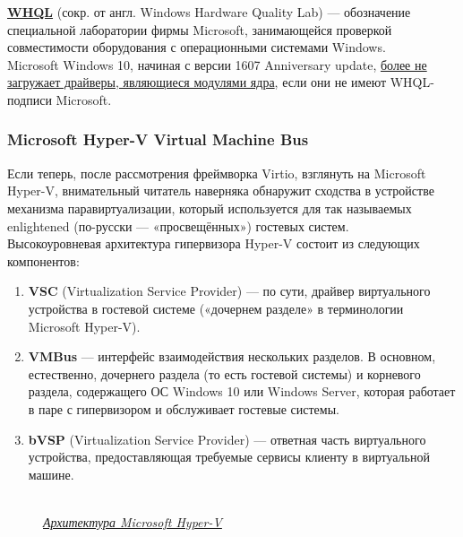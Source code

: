 \documentclass[14pt, a4paper]{article}
\begin{document}
\href{https://ru.wikipedia.org/wiki/WHQL}{\textbf{WHQL}} (сокр. от англ. Windows Hardware Quality Lab) — обозначение специальной лаборатории
фирмы Microsoft, занимающейся проверкой совместимости оборудования с операционными
системами Windows.\\

Microsoft Windows 10, начиная с версии 1607 Anniversary update, \href{https://techcommunity.microsoft.com/t5/Windows-Hardware-Certification/Driver-Signing-changes-in-Windows-10-version-1607/ba-p/364894}{более не загружает драйверы,
являющиеся модулями ядра}, если они не имеют WHQL-подписи Microsoft.

\subsubsection*{Microsoft Hyper-V Virtual Machine Bus} 

Если теперь, после рассмотрения фреймворка Virtio, взглянуть на Microsoft Hyper-V, внимательный
читатель наверняка обнаружит сходства в устройстве механизма паравиртуализации, который
используется для так называемых enlightened (по-русски — «просвещённых») гостевых систем.\\

Высокоуровневая архитектура гипервизора Hyper-V состоит из следующих компонентов:

\begin{enumerate}
    \item \textbf{VSC} (Virtualization Service Provider) — по сути, драйвер виртуального устройства в гостевой
    системе («дочернем разделе» в терминологии Microsoft Hyper-V).
    \item \textbf{VMBus} — интерфейс взаимодействия нескольких разделов. В основном, естественно,
    дочернего раздела (то есть гостевой системы) и корневого раздела, содержащего ОС Windows
    10 или Windows Server, которая работает в паре с гипервизором и обслуживает гостевые
    системы.
    \item \textbf{bVSP} (Virtualization Service Provider) — ответная часть виртуального устройства,
    предоставляющая требуемые сервисы клиенту в виртуальной машине.
\end{enumerate}

\begin{figure}[h]
    \centering
    \\ 
    \href{https://docs.microsoft.com/ru-ru/virtualization/hyper-v-on-windows/reference/hyper-v-architecture}{\small\textit{Архитектура Microsoft Hyper-V}} 
    \label{framework} 
\end{figure}
\end{document}
